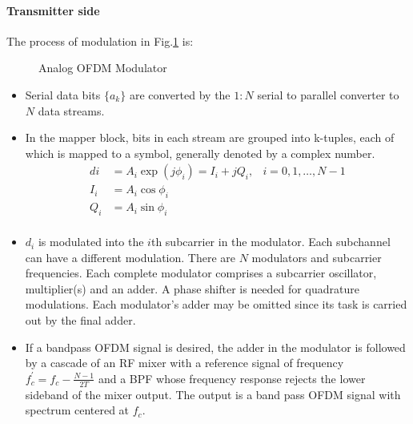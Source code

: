 \paragraph{Transmitter side}
The process of modulation in Fig.\ref{fig:anal_mod} is\cite{fuqin}:
\begin{figure}[h!]
	\centerline{\resizebox{16cm}{!}{}}
	\caption{Analog \gls{OFDM} Modulator}
	\label{fig:anal_mod}
\end{figure}
\begin{itemize}
	\item Serial data bits $\{ a_k\}$ are converted by the $1:N$ serial to parallel converter to $N$ data streams.
	\item In the mapper block, bits in each stream are grouped into k-tuples, each of which is mapped to a symbol, generally denoted by a complex number.
	\begin{align*}
	di &= A_i\exp (j\phi_i) = I_i + jQ_i,& i=0,1,\ldots,N-1\\
	I_i &= A_i\cos \phi_i\\
	Q_i &= A_i\sin\phi_i\\
	\end{align*}
	\item $d_i$ is modulated into the $i$th subcarrier in the modulator. Each subchannel can have a different modulation. There are $N$ modulators and subcarrier frequencies. Each complete modulator comprises a subcarrier oscillator, multiplier(s) and an adder. A phase shifter is needed for quadrature modulations. Each modulator's adder may be omitted since its task is carried out by the final adder.
	\item If a bandpass OFDM signal is desired, the adder in the modulator is followed by a cascade of an RF mixer with a reference signal of frequency $f_c^\prime = f_c - \frac{N-1}{2T}$ and a \gls{BPF} whose frequency response rejects the lower sideband of the mixer output. The output is a band pass \gls{OFDM} signal with spectrum centered at $f_c$. 
\end{itemize}

